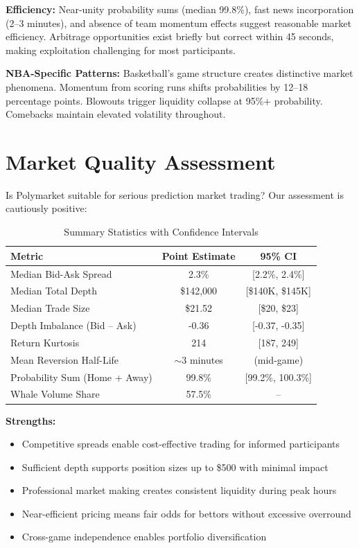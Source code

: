 \textbf{Efficiency:} Near-unity probability sums (median 99.8\%), fast news incorporation (2--3 minutes), and absence of team momentum effects suggest reasonable market efficiency. Arbitrage opportunities exist briefly but correct within 45 seconds, making exploitation challenging for most participants.

\textbf{NBA-Specific Patterns:} Basketball's game structure creates distinctive market phenomena. Momentum from scoring runs shifts probabilities by 12--18 percentage points. Blowouts trigger liquidity collapse at 95\%+ probability. Comebacks maintain elevated volatility throughout.

\section{Market Quality Assessment}

Is Polymarket suitable for serious prediction market trading? Our assessment is cautiously positive:

\begin{table}[H]
\centering
\caption{Summary Statistics with Confidence Intervals}
\label{tab:final-summary}
\begin{tabular}{lcc}
\toprule
\textbf{Metric} & \textbf{Point Estimate} & \textbf{95\% CI} \\
\midrule
Median Bid-Ask Spread & 2.3\% & [2.2\%, 2.4\%] \\
Median Total Depth & \$142,000 & [\$140K, \$145K] \\
Median Trade Size & \$21.52 & [\$20, \$23] \\
Depth Imbalance (Bid -- Ask) & -0.36 & [-0.37, -0.35] \\
Return Kurtosis & 214 & [187, 249] \\
Mean Reversion Half-Life & $\sim$3 minutes & (mid-game) \\
Probability Sum (Home + Away) & 99.8\% & [99.2\%, 100.3\%] \\
Whale Volume Share & 57.5\% & -- \\
\bottomrule
\end{tabular}
\end{table}

\textbf{Strengths:}
\begin{itemize}
    \item Competitive spreads enable cost-effective trading for informed participants
    \item Sufficient depth supports position sizes up to \$500 with minimal impact
    \item Professional market making creates consistent liquidity during peak hours
    \item Near-efficient pricing means fair odds for bettors without excessive overround
    \item Cross-game independence enables portfolio diversification
\end{itemize}

